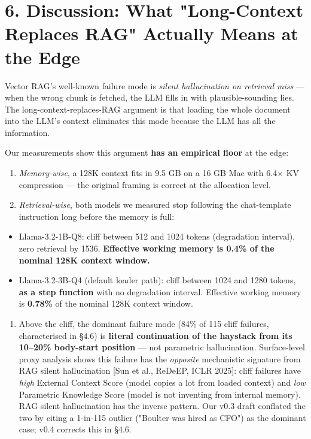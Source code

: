 \documentclass[11pt]{article}
\begin{document}
\section*{6. Discussion: What "Long-Context Replaces RAG" Actually Means at the Edge}


Vector RAG's well-known failure mode is \textit{silent hallucination on retrieval miss} — when the wrong chunk is fetched, the LLM fills in with plausible-sounding lies. The long-context-replaces-RAG argument is that loading the whole document into the LLM's context eliminates this mode because the LLM has all the information.


Our measurements show this argument \textbf{has an empirical floor} at the edge:


\begin{enumerate}
\item \textit{Memory-wise}, a 128K context fits in 9.5 GB on a 16 GB Mac with 6.4× KV compression — the original framing is correct at the allocation level.
\item \textit{Retrieval-wise}, both models we measured stop following the chat-template instruction long before the memory is full:
\end{enumerate}

\begin{itemize}
\item Llama-3.2-1B-Q8: cliff between 512 and 1024 tokens (degradation interval), zero retrieval by 1536. \textbf{Effective working memory is 0.4\% of the nominal 128K context window.}
\item Llama-3.2-3B-Q4 (default loader path): cliff between 1024 and 1280 tokens, \textbf{as a step function} with no degradation interval. Effective working memory is \textbf{0.78\%} of the nominal 128K context window.
\end{itemize}


\begin{enumerate}
\item Above the cliff, the dominant failure mode (84\% of 115 cliff failures, characterised in §4.6) is \textbf{literal continuation of the haystack from its 10–20\% body-start position} — not parametric hallucination. Surface-level proxy analysis shows this failure has the \textit{opposite} mechanistic signature from RAG silent hallucination [Sun et al., ReDeEP, ICLR 2025]: cliff failures have \textit{high} External Context Score (model copies a lot from loaded context) and \textit{low} Parametric Knowledge Score (model is not inventing from internal memory). RAG silent hallucination has the inverse pattern. Our v0.3 draft conflated the two by citing a 1-in-115 outlier ("Boulter was hired as CFO") as the dominant case; v0.4 corrects this in §4.6.
\end{enumerate}
\end{document}
